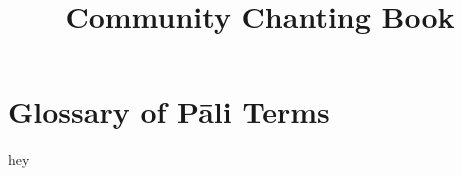 \documentclass[
  babelLanguage=english,
  final,
]{chantingbook}
\title{Community Chanting Book}
\begin{document}


\frontmatter

\cleartoverso


\cleartorecto
\tableofcontents*

\mainmatter



%

\appendix



\backmatter

\chapter{Glossary of Pāli Terms}

hey

\cleartorecto

\end{document}

